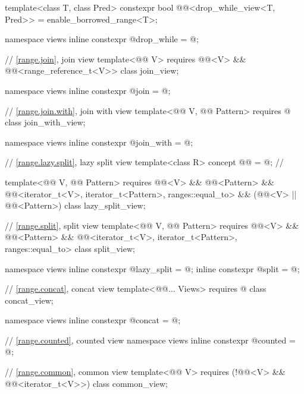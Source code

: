 \begin{codeblock}
{  template<class T, class Pred>
    constexpr bool @@<drop_while_view<T, Pred>> =
      enable_borrowed_range<T>;

  namespace views { inline constexpr @\unspecnc@ drop_while = @\unspecnc@; }

  // \ref{range.join}, join view
  template<@@ V>
    requires @@<V> && @@<range_reference_t<V>>
  class join_view;

  namespace views { inline constexpr @\unspecnc@ join = @\unspecnc@; }

  // \ref{range.join.with}, join with view
  template<@@ V, @@ Pattern>
    requires @\seebelow@
  class join_with_view;

  namespace views { inline constexpr @\unspecnc@ join_with = @\unspecnc@; }

  // \ref{range.lazy.split}, lazy split view
  template<class R>
    concept @@ = @\seebelow@;   // \expos

  template<@@ V, @@ Pattern>
    requires @@<V> && @@<Pattern> &&
             @@<iterator_t<V>, iterator_t<Pattern>, ranges::equal_to> &&
             (@@<V> || @@<Pattern>)
  class lazy_split_view;

  // \ref{range.split}, split view
  template<@@ V, @@ Pattern>
    requires @@<V> && @@<Pattern> &&
             @@<iterator_t<V>, iterator_t<Pattern>, ranges::equal_to>
  class split_view;

  namespace views {
    inline constexpr @\unspecnc@ lazy_split = @\unspecnc@;
    inline constexpr @\unspecnc@ split = @\unspecnc@;
  }

  // \ref{range.concat}, concat view
  template<@@... Views>
    requires @\seebelow@
  class concat_view;

  namespace views { inline constexpr @\unspecnc@ concat = @\unspecnc@; }

  // \ref{range.counted}, counted view
  namespace views { inline constexpr @\unspecnc@ counted = @\unspecnc@; }

  // \ref{range.common}, common view
  template<@@ V>
    requires (!@@<V> && @@<iterator_t<V>>)
  class common_view;

}
\end{codeblock}
